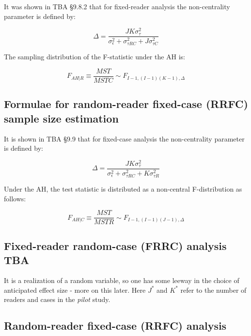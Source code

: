 \documentclass[
]{book}
\begin{document}
It was shown in TBA §9.8.2 that for fixed-reader analysis the non-centrality parameter is defined by:

\begin{equation}
\Delta=\frac{JK\sigma_{\tau}^2}{\sigma_{\epsilon}^2+\sigma_{\tau RC}^2+J\sigma_{\tau C}^2}
\label{eq:DeltaFRRC}
\end{equation}

The sampling distribution of the F-statistic under the AH is:

\begin{equation}
F_{AH|R}\equiv \frac{MST}{MSTC}\sim F_{I-1,(I-1)(K-1),\Delta}
\label{eq:SamplingFFRRC}
\end{equation}

\hypertarget{roc-sample-size-dbm-RRFC-sample-size-estimation}{%
\subsection{Formulae for random-reader fixed-case (RRFC) sample size estimation}\label{roc-sample-size-dbm-RRFC-sample-size-estimation}}

It is shown in TBA §9.9 that for fixed-case analysis the non-centrality parameter is defined by:

\begin{equation}
\Delta=\frac{JK\sigma_{\tau}^2}{\sigma_{\epsilon}^2+\sigma_{\tau RC}^2+K\sigma_{\tau R}^2}
\label{eq:DeltaFRRFC}
\end{equation}

Under the AH, the test statistic is distributed as a non-central F-distribution as follows:

\begin{equation}
F_{AH|C}\equiv \frac{MST}{MSTR}\sim F_{I-1,(I-1)(J-1),\Delta}
\label{eq:SamplingFRRFC}
\end{equation}

\hypertarget{roc-sample-size-dbm-FRRCAnalysis}{%
\subsection{Fixed-reader random-case (FRRC) analysis TBA}\label{roc-sample-size-dbm-FRRCAnalysis}}

It is a realization of a random variable, so one has some leeway in the choice of anticipated effect size - more on this later.
Here \(J^*\) and \(K^*\) refer to the number of readers and cases in the \emph{pilot} study.

\hypertarget{roc-sample-size-dbm-RRFCAnalysis}{%
\subsection{Random-reader fixed-case (RRFC) analysis}\label{roc-sample-size-dbm-RRFCAnalysis}}
\end{document}
